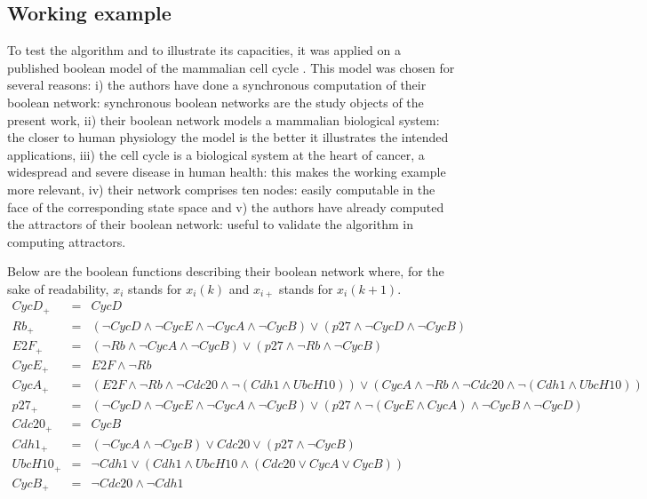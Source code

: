 \documentclass[oneside,a4paper,onecolumn,notitlepage]{article}
\begin{document}
\subsection{Working example}
To test the algorithm and to illustrate its capacities, it was applied on a published boolean model of the mammalian cell cycle \cite{faure2006dynamical}. This model was chosen for several reasons: i) the authors have done a synchronous computation of their boolean network: synchronous boolean networks are the study objects of the present work, ii) their boolean network models a mammalian biological system: the closer to human physiology the model is the better it illustrates the intended applications, iii) the cell cycle is a biological system at the heart of cancer, a widespread and severe disease in human health: this makes the working example more relevant, iv) their network comprises ten nodes: easily computable in the face of the corresponding state space and v) the authors have already computed the attractors of their boolean network: useful to validate the algorithm in computing attractors.

Below are the boolean functions describing their boolean network where, for the sake of readability, $x_i$ stands for $x_{i}(k)$ and $x_{i+}$ stands for $x_{i}(k+1)$.
{\tiny
\begin{eqnarray*}
CycD_{+}&=&CycD\\
Rb_{+}&=&(\lnot CycD \land \lnot CycE \land \lnot CycA \land \lnot CycB) \lor (p27 \land \lnot CycD \land \lnot CycB)\\
E2F_{+}&=&(\lnot Rb \land \lnot CycA \land \lnot CycB) \lor (p27 \land \lnot Rb \land \lnot CycB)\\
CycE_{+}&=&E2F \land \lnot Rb\\
CycA_{+}&=&(E2F \land \lnot Rb \land \lnot Cdc20 \land \lnot(Cdh1 \land UbcH10)) \lor (CycA \land \lnot Rb \land \lnot Cdc20 \land \lnot(Cdh1 \land UbcH10))\\
p27_{+}&=&(\lnot CycD \land \lnot CycE \land \lnot CycA \land \lnot CycB) \lor (p27 \land \lnot(CycE \land CycA) \land \lnot CycB \land \lnot CycD)\\
Cdc20_{+}&=&CycB\\
Cdh1_{+}&=&(\lnot CycA \land \lnot CycB) \lor Cdc20 \lor (p27 \land \lnot CycB)\\
UbcH10_{+}&=&\lnot Cdh1 \lor (Cdh1 \land UbcH10 \land (Cdc20 \lor CycA \lor CycB))\\
CycB_{+}&=&\lnot Cdc20 \land \lnot Cdh1
\end{eqnarray*}
}
\end{document}
